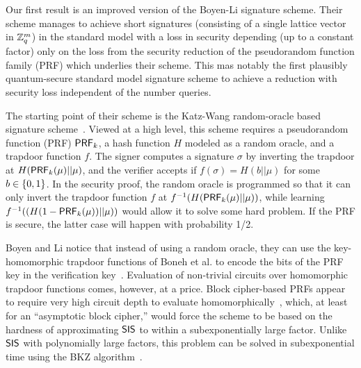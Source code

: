 Our first result is an improved version of the Boyen-Li signature scheme.
Their scheme manages to achieve short signatures (consisting of a single lattice vector in $\mathbb{Z}_q^{m}$) in the standard model with a loss in security depending (up to a constant factor) only on the loss from the security reduction of the pseudorandom function family (PRF) which underlies their scheme. This mas notably the first plausibly quantum-secure standard model signature scheme to achieve a reduction with security loss independent of the number queries.

The starting point of their scheme is the Katz-Wang random-oracle based signature scheme~\cite{DBLP:conf/ccs/KatzW03}. Viewed at a high level, this scheme requires a pseudorandom function (PRF) $\mathsf{PRF}_k$, a hash function $H$ modeled as a random oracle, and a trapdoor function $f$. The signer computes a signature $\sigma$ by  inverting the trapdoor at $H(\mathsf{PRF}_{k}(\mu) ||\mu)$, and the verifier accepts if $f(\sigma)=H(b || \mu)$ for some $b \in \{0,1\}$. In the security proof, the random oracle is programmed so that it can only invert the trapdoor function $f$ at $f^{-1}(H(\mathsf{PRF}_{k}(\mu) || \mu))$, while learning $f^{-1}((H(1-\mathsf{PRF}_{k}(\mu)) || \mu))$ would allow it to solve some hard problem. If the PRF is secure, the latter case will happen with probability 1/2.

Boyen and Li notice that instead of using a random oracle, they can use the key-homomorphic trapdoor functions of Boneh et al. to encode the bits of the PRF key in the verification key~\cite{DBLP:conf/eurocrypt/BonehGGHNSVV14}. Evaluation of non-trivial circuits over homomorphic trapdoor functions comes, however, at a price. Block cipher-based PRFs appear to require very high circuit depth to evaluate homomorphically~\cite{DBLP:conf/crypto/GentryHS12}, which, at least  for an ``asymptotic block cipher,'' would force the scheme to be based on the hardness of  approximating $\mathsf{SIS}$ to within a subexponentially large factor. Unlike $\mathsf{SIS}$ with polynomially large factors, this problem can be solved in subexponential time using the BKZ algorithm~\cite{DBLP:journals/mp/SchnorrE94,DBLP:conf/asiacrypt/ChenN11}.

